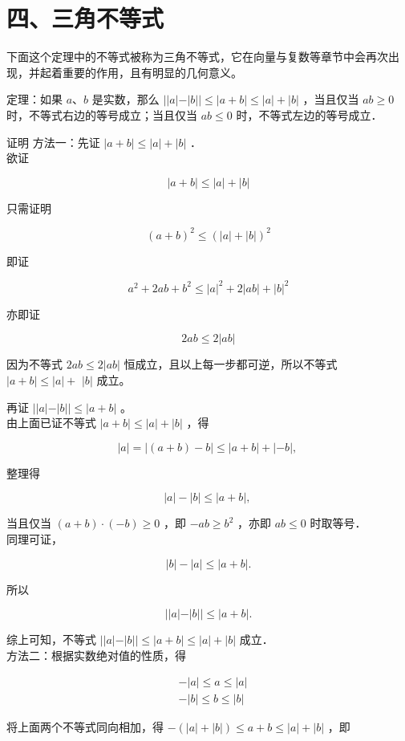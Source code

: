 \documentclass[10pt]{article}
\begin{document}
\section*{四、三角不等式}
下面这个定理中的不等式被称为三角不等式，它在向量与复数等章节中会再次出现，并起着重要的作用，且有明显的几何意义。

定理：如果 \(a 、 b\) 是实数，那么 \(||a|-|b|| \leqslant|a+b| \leqslant|a|+|b|\) ，当且仅当 \(a b \geqslant 0\) 时，不等式右边的等号成立；当且仅当 \(a b \leqslant 0\) 时，不等式左边的等号成立．

证明 方法一：先证 \(|a+b| \leqslant|a|+|b|\) ．\\
欲证

\[
|a+b| \leqslant|a|+|b|
\]

只需证明

\[
(a+b)^{2} \leqslant(|a|+|b|)^{2}
\]

即证

\[
a^{2}+2 a b+b^{2} \leqslant|a|^{2}+2|a b|+|b|^{2}
\]

亦即证

\[
2 a b \leqslant 2|a b|
\]

因为不等式 \(2 a b \leqslant 2|a b|\) 恒成立，且以上每一步都可逆，所以不等式 \(|a+b| \leqslant|a|+\) \(|b|\) 成立。

再证 \(||a|-|b|| \leqslant|a+b|\) 。\\
由上面已证不等式 \(|a+b| \leqslant|a|+|b|\) ，得

\[
|a|=|(a+b)-b| \leqslant|a+b|+|-b| \text {, }
\]

整理得

\[
|a|-|b| \leqslant|a+b| \text {, }
\]

当且仅当 \((a+b) \cdot(-b) \geqslant 0\) ，即 \(-a b \geqslant b^{2}\) ，亦即 \(a b \leqslant 0\) 时取等号．\\
同理可证，

\[
|b|-|a| \leqslant|a+b| .
\]

所以

\[
||a|-|b|| \leqslant|a+b| .
\]

综上可知，不等式 \(||a|-|b|| \leqslant|a+b| \leqslant|a|+|b|\) 成立．\\
方法二：根据实数绝对值的性质，得

\[
\begin{aligned}
& -|a| \leqslant a \leqslant|a| \\
& -|b| \leqslant b \leqslant|b|
\end{aligned}
\]

将上面两个不等式同向相加，得 \(-(|a|+|b|) \leqslant a+b \leqslant|a|+|b|\) ，即
\end{document}

